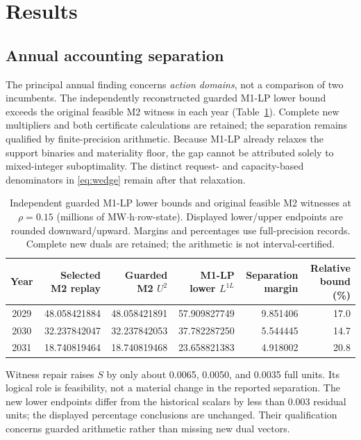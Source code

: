 \documentclass[10pt,journal]{IEEEtran}
\begin{document}
\section{Results}
\label{sec:results}
\subsection{Annual accounting separation}
The principal annual finding concerns \emph{action domains}, not a comparison of two incumbents. The independently reconstructed guarded M1-LP lower bound exceeds the original feasible M2 witness in each year (Table~\ref{tab:certificate}). Complete new multipliers and both certificate calculations are retained; the separation remains qualified by finite-precision arithmetic. Because M1-LP already relaxes the support binaries and materiality floor, the gap cannot be attributed solely to mixed-integer suboptimality. The distinct request- and capacity-based denominators in \eqref{eq:wedge} remain after that relaxation.

\begin{table}[t]
\centering
\caption{Independent guarded M1-LP lower bounds and original feasible M2 witnesses at $\rho=0.15$ (millions of MW$\cdot$h$\cdot$row-state). Displayed lower/upper endpoints are rounded downward/upward. Margins and percentages use full-precision records. Complete new duals are retained; the arithmetic is not interval-certified.}
\label{tab:certificate}
\footnotesize
\begin{tabular}{@{}crrrrr@{}}
\toprule
Year & Selected M2 replay & Guarded M2 $U^2$ & M1-LP lower $L^{1L}$ & Separation margin & Relative bound (\%)\\
\midrule
2029 & 48.058421884 & 48.058421891 & 57.909827749 & 9.851406 & 17.0\\
2030 & 32.237842047 & 32.237842053 & 37.782287250 & 5.544445 & 14.7\\
2031 & 18.740819464 & 18.740819468 & 23.658821383 & 4.918002 & 20.8\\
\bottomrule
\end{tabular}
\end{table}

Witness repair raises $S$ by only about 0.0065, 0.0050, and 0.0035 full units. Its logical role is feasibility, not a material change in the reported separation. The new lower endpoints differ from the historical scalars by less than 0.003 residual units; the displayed percentage conclusions are unchanged. Their qualification concerns guarded arithmetic rather than missing new dual vectors.
\end{document}
